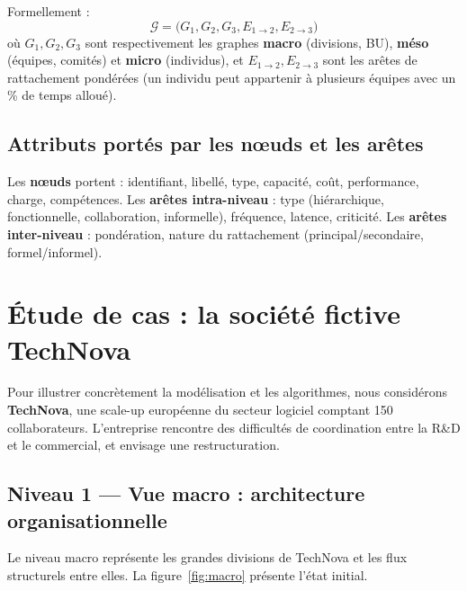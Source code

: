 \documentclass[11pt,a4paper]{article}
\begin{document}
Formellement :
\[
\mathcal{G} = \big(G_1, G_2, G_3, E_{1\to 2}, E_{2\to 3}\big)
\]
où $G_1, G_2, G_3$ sont respectivement les graphes \textbf{macro} (divisions, BU), \textbf{méso} (équipes, comités) et \textbf{micro} (individus), et $E_{1\to 2}, E_{2\to 3}$ sont les arêtes de rattachement pondérées (un individu peut appartenir à plusieurs équipes avec un \% de temps alloué).

\subsection{Attributs portés par les nœuds et les arêtes}

Les \textbf{nœuds} portent : identifiant, libellé, type, capacité, coût, performance, charge, compétences. Les \textbf{arêtes intra-niveau} : type (hiérarchique, fonctionnelle, collaboration, informelle), fréquence, latence, criticité. Les \textbf{arêtes inter-niveau} : pondération, nature du rattachement (principal/secondaire, formel/informel).

\section{Étude de cas : la société fictive TechNova}

Pour illustrer concrètement la modélisation et les algorithmes, nous considérons \textbf{TechNova}, une scale-up européenne du secteur logiciel comptant 150 collaborateurs. L'entreprise rencontre des difficultés de coordination entre la R\&D et le commercial, et envisage une restructuration.

\subsection{Niveau 1 --- Vue macro : architecture organisationnelle}

Le niveau macro représente les grandes divisions de TechNova et les flux structurels entre elles. La figure~\ref{fig:macro} présente l'état initial.
\end{document}

